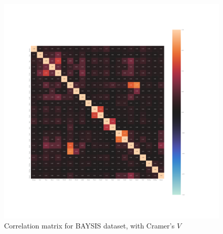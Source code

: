 \documentclass[a4paper,headsepline,footsepline,fontsize=11pt,BCOR=12mm,DIV=12]{report}
\begin{document}
\begin{appendices}
\begin{figure}[h]
	\centering
	\includegraphics[scale=0.4, trim=2cm 6cm 0cm 6cm]{../CorrAnalysis/data/BAYSIS/01_dataset/plots/baysis_dataset_corr_cramers}
	\caption{Correlation matrix for BAYSIS dataset, with Cramer's $V$}
	\label{img:appendix_correlation_matrix_dataset_cramers}
\end{figure}
\restoregeometry


\end{appendices}
\end{document}
